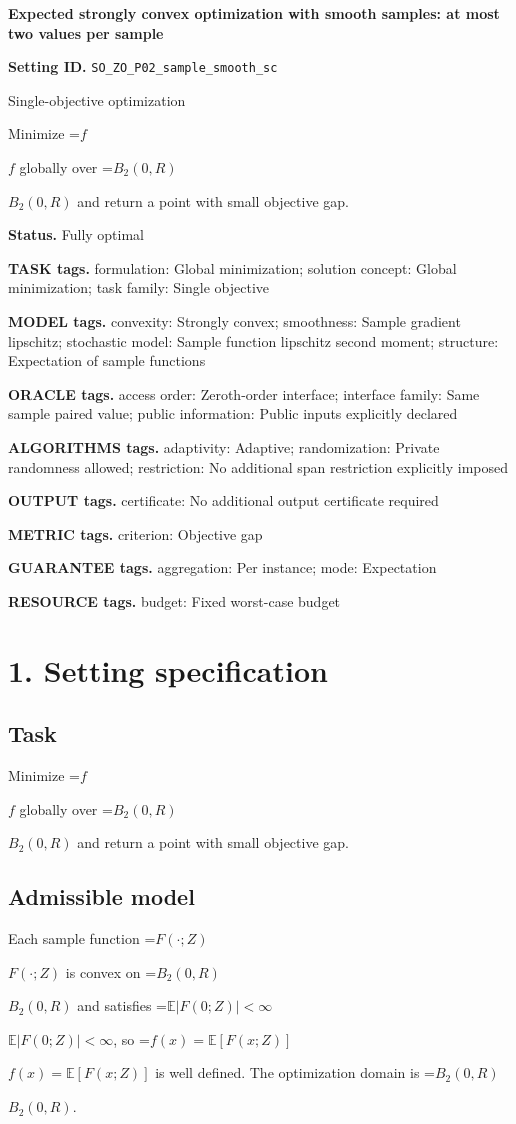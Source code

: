 \documentclass[10pt,a4paper]{article}
\newcommand{\AtlasMath}[1]{\par\begingroup\centering\setbox0=\hbox{$\displaystyle #1$}\ifdim\wd0>1.4\linewidth\typeout{ATLAS WIDE FORMULA: \the\wd0}\fi\ifdim\wd0>\linewidth\resizebox{\linewidth}{!}{\box0}\else\box0\fi\par\endgroup}
\newcommand{\AtlasInlineMath}[1]{\begingroup\setbox0=\hbox{$#1$}\ifdim\wd0>.4\linewidth\endgroup\AtlasMath{#1}\else\endgroup$#1$\fi}
\begin{document}
\raggedright

{\LARGE\bfseries\sffamily\color{AtlasNavy} Expected strongly convex optimization with smooth samples: at most two values per sample\par}\vspace{5pt}
\textbf{Setting ID.} \texttt{SO\_\allowbreak{}ZO\_\allowbreak{}P02\_\allowbreak{}sample\_\allowbreak{}smooth\_\allowbreak{}sc}

Single-objective optimization

Minimize \AtlasInlineMath{f} globally over \AtlasInlineMath{B_2(0,R)} and return a point with small objective gap.

\textbf{Status.} Fully optimal

\textbf{TASK tags.} formulation: Global minimization; solution concept: Global minimization; task family: Single objective

\textbf{MODEL tags.} convexity: Strongly convex; smoothness: Sample gradient lipschitz; stochastic model: Sample function lipschitz second moment; structure: Expectation of sample functions

\textbf{ORACLE tags.} access order: Zeroth-order interface; interface family: Same sample paired value; public information: Public inputs explicitly declared

\textbf{ALGORITHMS tags.} adaptivity: Adaptive; randomization: Private randomness allowed; restriction: No additional span restriction explicitly imposed

\textbf{OUTPUT tags.} certificate: No additional output certificate required

\textbf{METRIC tags.} criterion: Objective gap

\textbf{GUARANTEE tags.} aggregation: Per instance; mode: Expectation

\textbf{RESOURCE tags.} budget: Fixed worst-case budget

\section{1. Setting specification}
\subsection{Task}
Minimize \AtlasInlineMath{f} globally over \AtlasInlineMath{B_2(0,R)} and return a point with small objective gap.

\subsection{Admissible model}
Each sample function \AtlasInlineMath{F(\cdot;Z)} is convex on \AtlasInlineMath{B_2(0,R)} and satisfies \AtlasInlineMath{\mathbb{E}|F(0;Z)|<\infty}, so \AtlasInlineMath{f(x)=\mathbb{E}[F(x;Z)]} is well defined. The optimization domain is \AtlasInlineMath{B_2(0,R)}.
\end{document}
